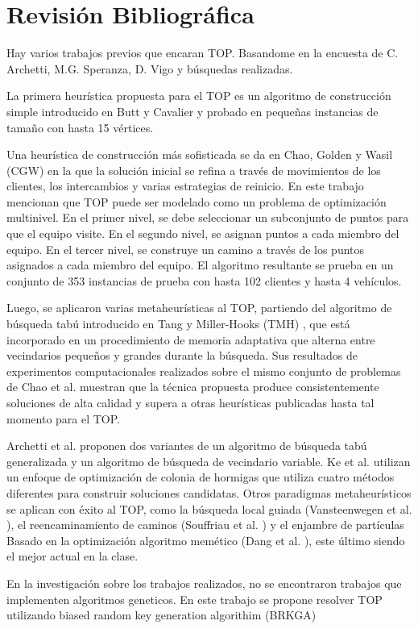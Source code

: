 

\chapter{Revisión Bibliográfica}

Hay varios trabajos previos que encaran TOP. Basandome en la encuesta de C. Archetti, M.G. Speranza, D. Vigo \cite{ArchettiSperanzaVigo} y búsquedas realizadas.

\bigskip

La primera heurística propuesta para el TOP es un algoritmo de construcción simple introducido en Butt y Cavalier \cite{ButtCavalier} y probado en pequeñas instancias de tamaño con hasta 15 vértices.

\bigskip

Una heurística de construcción más sofisticada se da en Chao, Golden y Wasil (CGW) \cite{ChaoGoldenWasil} en la que la solución inicial se refina a través de movimientos de los clientes, los intercambios y varias estrategias de reinicio. En este trabajo mencionan que TOP puede ser modelado como un problema de optimización multinivel. En el primer nivel, se debe seleccionar un subconjunto de puntos para que el equipo visite. En el segundo nivel, se asignan puntos a cada miembro del equipo. En el tercer nivel, se construye un camino a través de los puntos asignados a cada miembro del equipo. El algoritmo resultante se prueba en un conjunto de 353 instancias de prueba con hasta 102 clientes y hasta 4 vehículos.

\bigskip

Luego, se aplicaron varias metaheurísticas al TOP, partiendo del algoritmo de búsqueda tabú introducido en Tang y Miller-Hooks (TMH) \cite{TangMillerHooks}, que está incorporado en un procedimiento de memoria adaptativa que alterna entre vecindarios pequeños y grandes durante la búsqueda. Sus resultados de experimentos computacionales realizados sobre el mismo conjunto de problemas de Chao et al. muestran que la técnica propuesta produce consistentemente soluciones de alta calidad y supera a otras heurísticas publicadas hasta tal momento para el TOP.

\bigskip

Archetti et al. \cite{ArchettiHertzSperanza} proponen dos variantes de un algoritmo de búsqueda tabú generalizada y un algoritmo de búsqueda de vecindario variable. Ke et al. \cite{KeArchettiFeng} utilizan un enfoque de optimización de colonia de hormigas que utiliza cuatro métodos diferentes para construir soluciones candidatas. Otros paradigmas metaheurísticos se aplican con éxito al TOP, como la búsqueda local guiada (Vansteenwegen et al. \cite{Vansteenwegen} ), el reencaminamiento de caminos (Souffriau et al. \cite{Souffriau}) y el enjambre de partículas Basado en la optimización algoritmo memético (Dang et al. \cite{Dang}), este último siendo el mejor actual en la clase.

\bigskip

En la investigación sobre los trabajos realizados, no se encontraron trabajos que implementen algoritmos geneticos. En este trabajo se propone resolver TOP utilizando biased random key generation algorithim (BRKGA)









